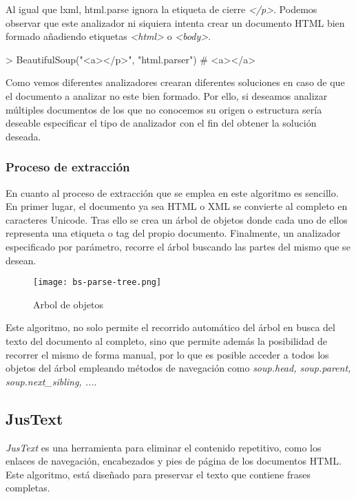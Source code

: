 Al igual que lxml, html.parse ignora la etiqueta de cierre \emph{</p>}. Podemos observar que este analizador 
ni siquiera intenta crear un documento HTML bien formado añadiendo etiquetas \emph{<html>} o \emph{<body>}.

\begin{Schunk}
  \begin{Soutput}
    > BeautifulSoup("<a></p>", "html.parser")
    # <a></a>
  \end{Soutput}
\end{Schunk}

Como vemos diferentes analizadores crearan diferentes soluciones en caso de que el documento a analizar
no este bien formado. Por ello, si deseamos analizar múltiples documentos de los que no conocemos su origen
o estructura sería deseable especificar el tipo de analizador con el fin del obtener la solución deseada.

\subsubsection{Proceso de extracción}
\label{subsubsec:proceso de extraccion}

En cuanto al proceso de extracción que se emplea en este algoritmo es sencillo. En primer lugar, el 
documento ya sea HTML o XML se convierte al completo en caracteres Unicode. Tras ello se crea un árbol de 
objetos donde cada uno de ellos representa una etiqueta o tag del propio documento. Finalmente, un 
analizador especificado por parámetro, recorre el árbol buscando las partes del mismo que se desean.

\begin{figure}[tphb]
  \centering
  \texttt{[image: bs-parse-tree.png]}
  \caption{Arbol de objetos}
  \label{img:arbol de objetos}
\end{figure}

Este algoritmo, no solo permite el recorrido automático del árbol en busca del texto del documento al
completo, sino que permite además la posibilidad de recorrer el mismo de forma manual, por lo que es posible
acceder a todos los objetos del árbol empleando métodos de navegación como \emph{soup.head, soup.parent,
soup.next\_sibling, ...}.

\subsection{JusText}
\label{subsec:justext}

\emph{JusText} \cite{justext} es una herramienta para eliminar el contenido repetitivo, como los enlaces
de navegación, encabezados y pies de página de los documentos HTML. Este algoritmo, está diseñado para
preservar el texto que contiene frases completas.

